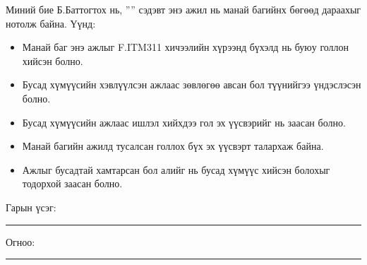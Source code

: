 \begin{declaration}
\addchaptertocentry{\authorshipname}

\noindent \qquad Миний бие Б.Баттогтох  нь, ''{\ttitle}'' сэдэвт энэ ажил нь манай багийнх бөгөөд дараахыг нотолж байна. Үүнд:

\begin{itemize} 
\item Манай баг энэ ажлыг F.ITM311 хичээлийн хүрээнд бүхэлд нь буюу голлон хийсэн болно.
\item Бусад хүмүүсийн хэвлүүлсэн ажлаас зөвлөгөө авсан бол түүнийгээ үндэслэсэн болно.
\item Бусад хүмүүсийн ажлаас ишлэл хийхдээ гол эх үүсвэрийг нь заасан болно.
\item Манай багийн ажилд тусалсан голлох бүх эх үүсвэрт талархаж байна.
\item Ажлыг бусадтай хамтарсан бол алийг нь бусад хүмүүс хийсэн болохыг тодорхой заасан болно.
\end{itemize}
\bigskip
 
\noindent Гарын үсэг: \rule[-0.5em]{12.7em}{0.5pt}
\bigskip

\noindent Огноо: \rule[-0.5em]{15em}{0.5pt}

\end{declaration}

\clearpage

